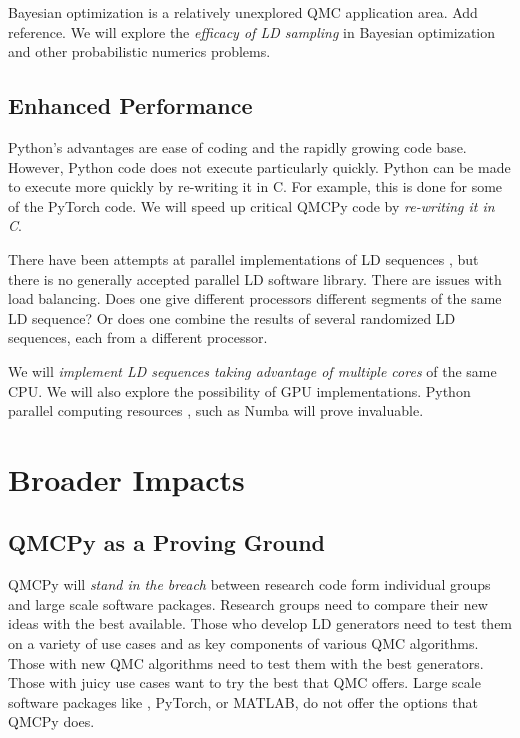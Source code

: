 \documentclass[11pt]{NSFamsart}
\begin{document}
Bayesian optimization is a relatively unexplored QMC application area. Add \cite{chen2019hierarchical} reference. We will explore the \emph{efficacy of LD sampling} in Bayesian optimization and other probabilistic numerics problems.



\subsection{Enhanced Performance}
Python's advantages are ease of coding and the rapidly growing code base.  However, Python code does not execute particularly quickly.  Python can be made to execute more quickly by re-writing it in C.  For example, this is done for some of the PyTorch code.  We will speed up critical QMCPy code by \emph{re-writing it in C}.  

There have been attempts at parallel implementations of LD sequences \cite{LiMul00a,OktSri02, SchUhl01,WanEtal06a,LiuHic04a}, but there is no generally accepted parallel LD software library.  There are issues with load balancing.  Does one give different processors different segments of the same LD sequence?  Or does one combine the results of several randomized LD sequences, each from a different processor.

We will \emph{implement LD sequences taking advantage of multiple cores} of the same CPU.  We will also explore the possibility of GPU implementations.  Python parallel computing resources \cite{ParallelPython}, such as Numba \cite{Numba} will prove invaluable.



\section{Broader Impacts}
\subsection{QMCPy as a Proving Ground}
QMCPy will \emph{stand in the breach} between research code form individual groups and large scale software packages.  Research groups need to compare their new ideas with the best available.  Those who develop LD generators need to test them on a variety of use cases and as key components of various QMC algorithms.  Those with new QMC algorithms need to test them with the best generators.  Those with juicy use cases want to try the best that QMC offers.  Large scale software packages like , PyTorch, or MATLAB, do not offer the options that QMCPy does.
\end{document}
